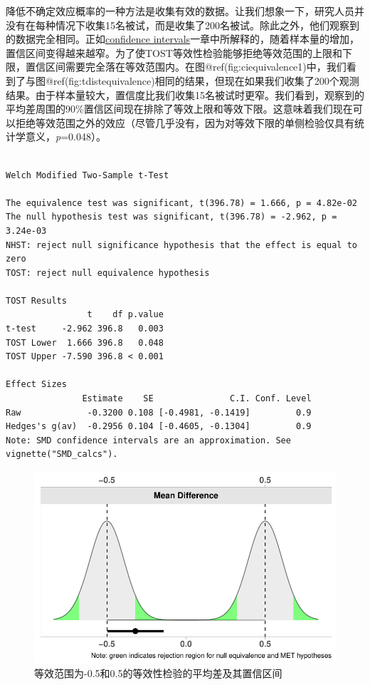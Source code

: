 \documentclass[
  letterpaper,
  DIV=11,
  numbers=noendperiod]{scrreprt}
\begin{document}
降低不确定效应概率的一种方法是收集有效的数据。让我们想象一下，研究人员并没有在每种情况下收集15名被试，而是收集了200名被试。除此之外，他们观察到的数据完全相同。正如\protect\hyperlink{confint}{confidence
intervals}一章中所解释的，随着样本量的增加，置信区间变得越来越窄。为了使TOST等效性检验能够拒绝等效范围的上限和下限，置信区间需要完全落在等效范围内。在图@ref(fig:ciequivalence1)中，我们看到了与图@ref(fig:tdistequivalence)相同的结果，但现在如果我们收集了200个观测结果。由于样本量较大，置信度比我们收集15名被试时更窄。我们看到，观察到的平均差周围的90\%置信区间现在排除了等效上限和等效下限。这意味着我们现在可以拒绝等效范围之外的效应（尽管几乎没有，因为对等效下限的单侧检验仅具有统计学意义，\emph{p}=0.048）。

\begin{verbatim}

Welch Modified Two-Sample t-Test

The equivalence test was significant, t(396.78) = 1.666, p = 4.82e-02
The null hypothesis test was significant, t(396.78) = -2.962, p = 3.24e-03
NHST: reject null significance hypothesis that the effect is equal to zero 
TOST: reject null equivalence hypothesis

TOST Results 
                t    df p.value
t-test     -2.962 396.8   0.003
TOST Lower  1.666 396.8   0.048
TOST Upper -7.590 396.8 < 0.001

Effect Sizes 
               Estimate    SE               C.I. Conf. Level
Raw             -0.3200 0.108 [-0.4981, -0.1419]         0.9
Hedges's g(av)  -0.2956 0.104 [-0.4605, -0.1304]         0.9
Note: SMD confidence intervals are an approximation. See vignette("SMD_calcs").
\end{verbatim}

\begin{figure}

{\centering \includegraphics[width=1\textwidth,height=\textheight]{09-equivalencetest_files/figure-pdf/fig-ciequivalence1-1.pdf}

}

\caption{\label{fig-ciequivalence1}等效范围为-0.5和0.5的等效性检验的平均差及其置信区间}

\end{figure}
\end{document}

